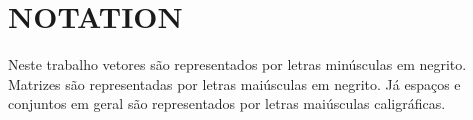 
\chapter*{NOTATION}

Neste trabalho vetores são representados por letras minúsculas em
negrito. Matrizes são representadas por letras maiúsculas em negrito.
Já espaços e conjuntos em geral são representados por letras maiúsculas
caligráficas. 

